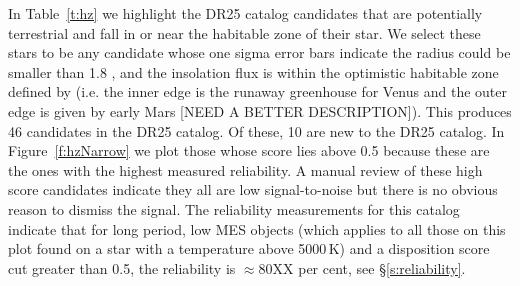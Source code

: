 In Table~\ref{t:hz} we highlight the DR25 catalog candidates that are potentially terrestrial and fall in or near the habitable zone of their star.  We select these stars to be any candidate whose one sigma error bars indicate the radius could be smaller than 1.8 \re, and the insolation flux is within the optimistic habitable zone defined by \citet{Kopparapu2013} (i.e. the inner edge is the runaway greenhouse for Venus and the outer edge is given by early Mars [NEED A BETTER DESCRIPTION]). This produces 46 candidates in the DR25 catalog. Of these, 10 are new to the DR25 catalog. In Figure~\ref{f:hzNarrow} we plot those whose score lies above 0.5 because these are the ones with the highest measured reliability.  A manual review of these high score  candidates indicate they all are low signal-to-noise but there is no obvious reason to dismiss the signal.  The reliability measurements for this catalog indicate that for long period, low MES objects (which applies to all those on this plot found on a star with a temperature above 5000\,K) and a disposition score cut greater than 0.5, the reliability is $\approx$80XX per cent, see \S\ref{s:reliability}. 



